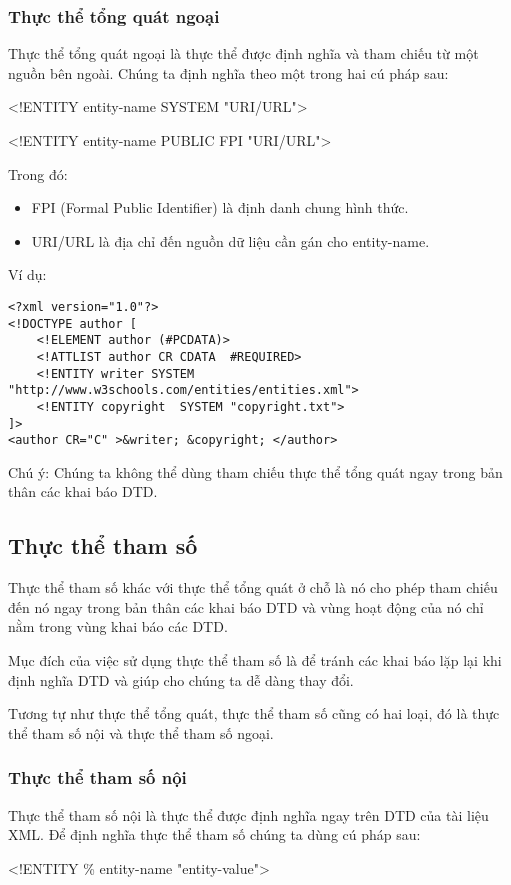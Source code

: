\subsubsection{Thực thể tổng quát ngoại }
Thực thể tổng quát ngoại  là thực thể được định nghĩa và tham chiếu từ một nguồn bên ngoài. Chúng ta định nghĩa theo một trong hai cú pháp sau:
\begin{center}
 {\ttfamily

 <!ENTITY entity-name SYSTEM "URI/URL">
 
 <!ENTITY entity-name PUBLIC  FPI "URI/URL">
  }
\end{center}

  Trong đó:
\begin{itemize}
\item FPI (Formal Public Identifier) là định danh chung hình thức.
  
\item  URI/URL là địa chỉ đến nguồn dữ liệu cần gán cho entity-name.
\end{itemize}   

Ví dụ:
\lstset{language=XML}
\begin{lstlisting}
<?xml version="1.0"?> 
<!DOCTYPE author [ 
	<!ELEMENT author (#PCDATA)> 
	<!ATTLIST author CR CDATA  #REQUIRED> 
	<!ENTITY writer SYSTEM "http://www.w3schools.com/entities/entities.xml"> 
	<!ENTITY copyright  SYSTEM "copyright.txt"> 
]> 
<author CR="C" >&writer; &copyright; </author>
\end{lstlisting}

Chú ý: Chúng ta không thể dùng tham chiếu thực thể tổng quát ngay trong bản thân các khai báo DTD. 
\subsection{Thực thể tham số}
Thực thể tham số khác với thực thể tổng quát ở chỗ là nó cho phép tham chiếu đến nó ngay trong bản thân các khai báo DTD và vùng hoạt động của nó chỉ nằm trong vùng khai báo các DTD.

  Mục đích của việc sử dụng thực thể tham số là để tránh các khai báo lặp lại khi định nghĩa DTD và giúp cho chúng ta dễ dàng thay đổi.
  
  Tương tự như thực thể tổng quát, thực thể tham số cũng có hai loại, đó là thực thể tham số nội và thực thể tham số ngoại.
\subsubsection{Thực thể tham số nội}
Thực thể tham số nội là thực thể được định nghĩa ngay trên DTD của tài liệu XML. Để định nghĩa thực thể tham số chúng ta dùng cú pháp sau:
 \begin{center}
  {\ttfamily
 \indent <!ENTITY \% entity-name "entity-value">
 }
 \end{center}
 
